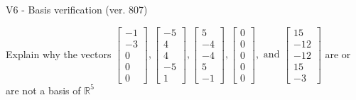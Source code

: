 \begin{exercise}
  \begin{exerciseTitle}V6 - Basis verification (ver. 807)\end{exerciseTitle}
  \begin{exerciseStatement}
    Explain why the vectors \(\left[\begin{array}{r}
-1 \\
-3 \\
0 \\
0 \\
0
\end{array}\right] , \left[\begin{array}{r}
-5 \\
4 \\
4 \\
-5 \\
1
\end{array}\right] , \left[\begin{array}{r}
5 \\
-4 \\
-4 \\
5 \\
-1
\end{array}\right] , \left[\begin{array}{r}
0 \\
0 \\
0 \\
0 \\
0
\end{array}\right] , \text{ and } \left[\begin{array}{r}
15 \\
-12 \\
-12 \\
15 \\
-3
\end{array}\right]\) are or are not a basis of \(\mathbb{R}^5\)	



\end{exerciseStatement}
\end{exercise}

